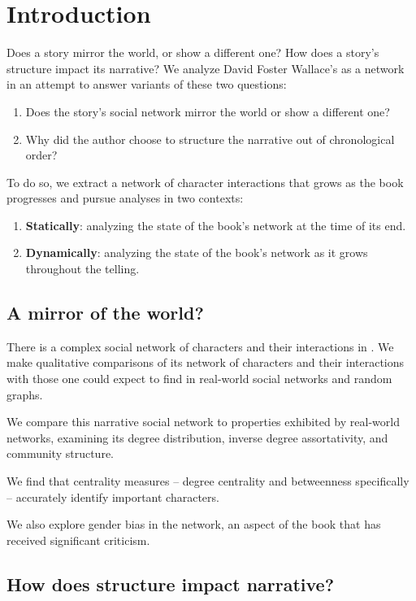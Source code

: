 \section{Introduction}

Does a story mirror the world, or show a different one? How does a story's structure impact its narrative? We analyze David Foster Wallace's \infinitejest as a network in an attempt to answer variants of these two questions:

\begin{enumerate}
    \item Does the story's social network mirror the world or show a different one?
    \item Why did the author choose to structure the narrative out of chronological order?
\end{enumerate}

To do so, we extract a network of character interactions that grows as the book progresses and pursue analyses in two contexts:

\begin{enumerate}
    \item \textbf{Statically}: analyzing the state of the book's network at the time of its end. 
    \item \textbf{Dynamically}: analyzing the state of the book's network as it grows throughout the telling.
\end{enumerate}

\subsection{A mirror of the world?}

There is a complex social network of characters and their interactions in \infinitejest. We make qualitative comparisons of its network of characters and their interactions with those one could expect to find in real-world social networks and random graphs. 

We compare this narrative social network to properties exhibited by real-world networks, examining its degree distribution, inverse degree assortativity, and community structure.

We find that centrality measures -- degree centrality and betweenness specifically -- accurately identify important characters. 

We also explore gender bias in the network, an aspect of the book that has received significant criticism.

\subsection{How does structure impact narrative?}

